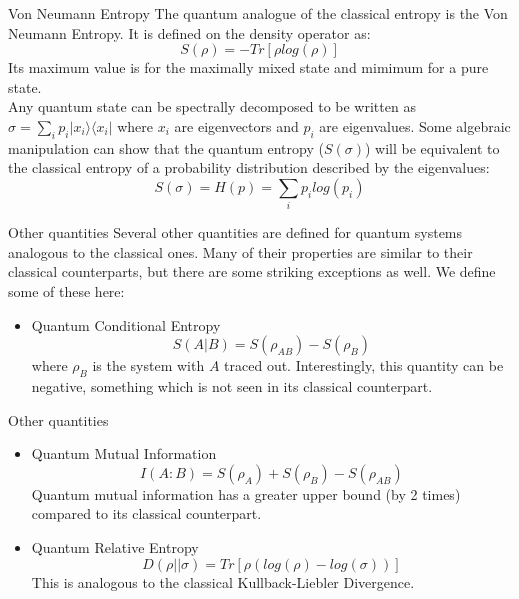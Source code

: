 \begin{frame}{Von Neumann Entropy}
    The quantum analogue of the classical entropy is the Von Neumann Entropy. It is defined on the density operator as:
    \begin{equation*}
        S(\rho) = -Tr[\rho log(\rho)]
    \end{equation*}
    Its maximum value is for the maximally mixed state and mimimum for a pure state.\\
    Any quantum state can be spectrally decomposed to be written as $\sigma = \sum_{i}p_i | x_i \rangle \langle x_i |$ where ${x_i}$ are eigenvectors
    and ${p_i}$ are eigenvalues. Some algebraic manipulation can show that the quantum entropy ($S(\sigma)$) will be equivalent to the classical entropy of
    a probability distribution described by the eigenvalues:
    \begin{equation*}
        S(\sigma) = H(p) = \sum_i p_i log(p_i)
    \end{equation*}
\end{frame}

\begin{frame}{Other quantities}
    Several other quantities are defined for quantum systems analogous to the classical ones. Many of their properties are similar to their classical counterparts,
    but there are some striking exceptions as well. We define some of these here:
    \begin{itemize}
        \item Quantum Conditional Entropy
        $$S(A|B) = S(\rho_{AB}) - S(\rho_B)$$
        where $\rho_B$ is the system with $A$ traced out. Interestingly, this quantity can be negative, something which is not seen in its classical counterpart.
    \end{itemize}
\end{frame}

\begin{frame}{Other quantities}
    \begin{itemize}
        \item Quantum Mutual Information
        $$I(A:B) = S(\rho_A) + S(\rho_B) - S(\rho_{AB})$$
        Quantum mutual information has a greater upper bound (by 2 times) compared to its classical counterpart.
        \item Quantum Relative Entropy
        $$D(\rho || \sigma) = Tr[\rho (log(\rho) - log(\sigma))]$$
        This is analogous to the classical Kullback-Liebler Divergence.
    \end{itemize}
\end{frame}
